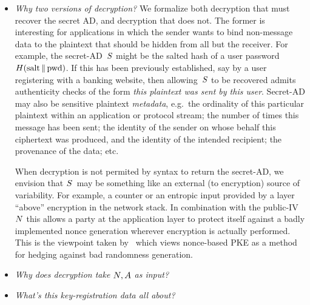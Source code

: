 \begin{itemize}
\item\emph{Why two versions of decryption?}  We formalize both decryption that must recover the secret AD, and decryption that does not.  The former is interesting for applications in which the sender wants to bind non-message data to the plaintext that should be hidden from all but the receiver.  For example, the secret-AD~$S$ might be the salted hash of a user password $H(\mathrm{salt} \,\|\, \mathrm{pwd})$.  If this has been previously established, say by a user registering with a banking website, then allowing~$S$ to be recovered admits authenticity checks of the form \emph{this plaintext was sent by this user}.  Secret-AD may also be sensitive plaintext \emph{metadata}, e.g.\ the ordinality of this particular plaintext within an application or protocol stream; the number of times this message has been sent; the identity of the sender on whose behalf this ciphertext was produced, and the identity of the intended recipient; the provenance of the data; etc. 

When decryption is not permited by syntax to return the secret-AD, we envision that $S$~may be something like an external (to encryption) source of variability.  For example, a counter or an entropic input provided by a layer ``above'' encryption in the network stack.  In combination with the public-IV~$N$ this allows a party at the application layer to protect itself against a badly implemented nonce generation wherever encryption is actually performed.  
This is the viewpoint taken by~\cite{mihir} which views nonce-based PKE as a method for hedging against bad randomness generation.

\item\emph{Why does decryption take $N,A$ as input?} 

\item\emph{What's this key-registration data all about?}  
\end{itemize}
 

